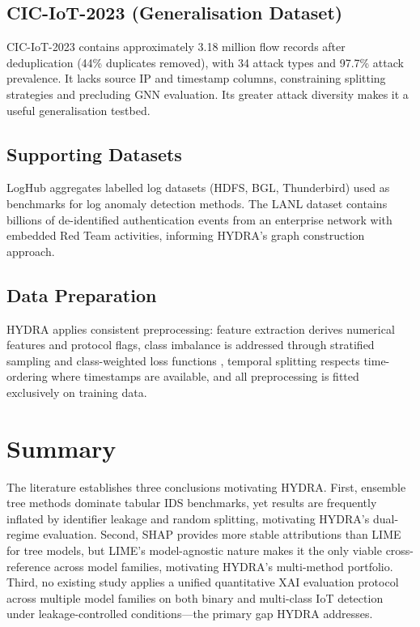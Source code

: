 \documentclass[12pt,a4paper]{report}
\begin{document}
\subsection{CIC-IoT-2023 (Generalisation Dataset)}
\label{sec:ciciot}

CIC-IoT-2023 \cite{cic2023} contains approximately 3.18 million flow records after deduplication (44\% duplicates removed), with 34 attack types and 97.7\% attack prevalence. It lacks source IP and timestamp columns, constraining splitting strategies and precluding GNN evaluation. Its greater attack diversity makes it a useful generalisation testbed.

\subsection{Supporting Datasets}
\label{sec:supporting-data}

LogHub \cite{zhu2023} aggregates labelled log datasets (HDFS, BGL, Thunderbird) used as benchmarks for log anomaly detection methods. The LANL dataset \cite{turcotte2018} contains billions of de-identified authentication events from an enterprise network with embedded Red Team activities, informing HYDRA's graph construction approach.

\subsection{Data Preparation}
\label{sec:data-prep}

HYDRA applies consistent preprocessing: feature extraction derives numerical features and protocol flags, class imbalance is addressed through stratified sampling and class-weighted loss functions \cite{anbiaee2025}, temporal splitting respects time-ordering where timestamps are available, and all preprocessing is fitted exclusively on training data.

\section{Summary}
\label{sec:lit-summary}

The literature establishes three conclusions motivating HYDRA. First, ensemble tree methods dominate tabular IDS benchmarks, yet results are frequently inflated by identifier leakage and random splitting, motivating HYDRA's dual-regime evaluation. Second, SHAP provides more stable attributions than LIME for tree models, but LIME's model-agnostic nature makes it the only viable cross-reference across model families, motivating HYDRA's multi-method portfolio. Third, no existing study applies a unified quantitative XAI evaluation protocol across multiple model families on both binary and multi-class IoT detection under leakage-controlled conditions---the primary gap HYDRA addresses.
\end{document}
